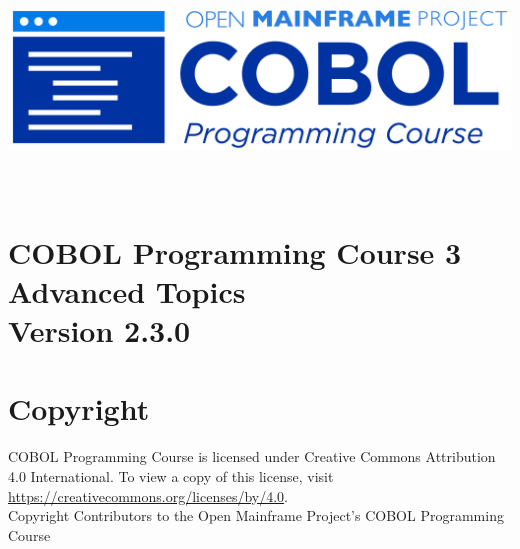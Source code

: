 \begin{center}
  \vspace*{25pt}
\includegraphics{Images/COBOL-Programming-Course.png}
\hypertarget{cobol-programming-course-3}{%
\section*{
  \\[35pt]
  \Huge COBOL Programming Course 3 \\[10pt]
  \Huge Advanced Topics \\[15pt]
  \Large Version 2.3.0}\label{cobol-programming-course-3}}
\end{center}

\pagebreak
\hypertarget{copyright}{%
\section*{Copyright}{
  \normalsize COBOL Programming Course is licensed under Creative Commons 
  Attribution 4.0 International. To view a copy of this license, visit 
  \href{https://creativecommons.org/licenses/by/4.0}{https://creativecommons.org/licenses/by/4.0}. \\[10pt]
  Copyright Contributors to the Open Mainframe Project's COBOL Programming Course}\label{copyright}}
\pagebreak